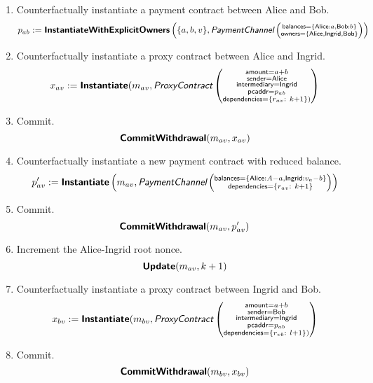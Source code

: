 \documentclass[prb,floatfix,reprint,nofootinbib,amsmath,amssymb,epsfig,pre,floats,letterpaper,groupedaffiliation,tightenlines,allcolors=blue,11pt]{revtex4}
\theoremstyle{definition}
\theoremstyle{definition}
\theoremstyle{definition}
\begin{document}
\begin{enumerate}
\item Counterfactually instantiate a payment contract between Alice and Bob.
\[
    p_{ab} := \textsf{\textbf{InstantiateWithExplicitOwners}}\left(\{a, b, v\}, \textit{\textsf{PaymentChannel}}\left(\substack{
        \textsf{balances}=\{\textsf{Alice}: a, \textsf{Bob}: b\} \\
        \textsf{owners}=\{\textsf{Alice}, \textsf{Ingrid}, \textsf{Bob}\}
    }\right)\right)
\]

\item Counterfactually instantiate a proxy contract between Alice and Ingrid.
\[
    x_{av} := \textsf{\textbf{Instantiate}}(m_{av}, \textit{\textsf{ProxyContract}}\left(\substack{
    \textsf{amount}=a+b \\
    \textsf{sender}=\textsf{Alice} \\
    \textsf{intermediary}=\textsf{Ingrid} \\
    \textsf{pcaddr}=p_{ab} \\
    \textsf{dependencies}=\left\{r_{av}:\ k + 1\right\})
    }\right)
\]

\item Commit.
\[
    \textsf{\textbf{CommitWithdrawal}}(m_{av}, x_{av})
\]

\item Counterfactually instantiate a new payment contract with reduced balance.
\[
    p'_{av} := \textsf{\textbf{Instantiate}}\left(m_{av},
        \textit{\textsf{PaymentChannel}}\left(\substack{
        \textsf{balances}=\{\textsf{Alice}: A-a, \textsf{Ingrid}: v_a - b\} \\
        \textsf{dependencies}=\left\{r_{av}:\ k+1\right\}
        }\right)
        \right)
\]

\item Commit.
\[
    \textsf{\textbf{CommitWithdrawal}}(m_{av}, p'_{av})
\]

\item Increment the Alice-Ingrid root nonce.
\[
    \textsf{\textbf{Update}}(m_{av}, k+1)
\]

\item Counterfactually instantiate a proxy contract between Ingrid and Bob.
\[
    x_{bv} := \textsf{\textbf{Instantiate}}(m_{bv}, \textit{\textsf{ProxyContract}}\left(\substack{
    \textsf{amount}=a+b \\
    \textsf{sender}=\textsf{Bob} \\
    \textsf{intermediary}=\textsf{Ingrid} \\
    \textsf{pcaddr}=p_{ab} \\
    \textsf{dependencies}=\left\{r_{vb}:\ l + 1\right\})
    }\right)
\]

\item Commit.
\[
    \textsf{\textbf{CommitWithdrawal}}(m_{bv}, x_{bv})
\]


\end{enumerate}
\end{document}
